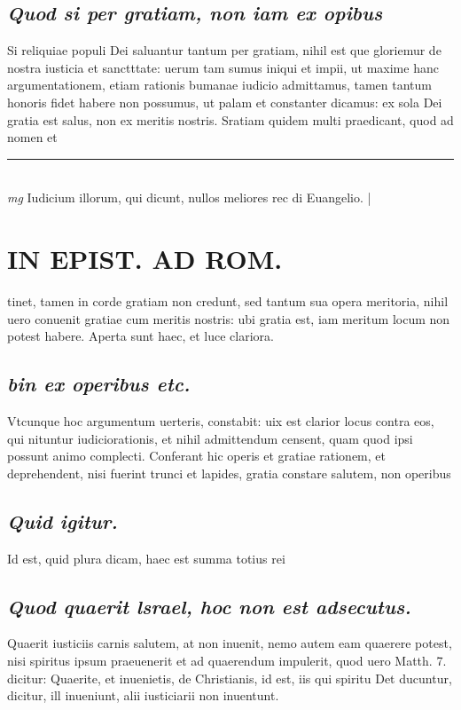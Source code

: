 \documentclass{article}
\begin{document}
\begin{pages}
\subsection*{\textit{Quod si per gratiam, non iam ex opibus }}\pstart Si reliquiae populi Dei saluantur tantum per gratiam, nihil est que gloriemur de nostra iusticia et sanctttate: uerum tam sumus iniqui et impii, ut maxime hanc argumentationem, etiam rationis bumanae iudicio admittamus, tamen tantum honoris fidet habere non possumus, ut palam et constanter dicamus: ex sola Dei gratia est salus, non ex meritis nostris. Sratiam quidem multi praedicant, quod ad nomen et  \pend
\vspace{0.5cm}\noindent
\vspace{0.2cm}\rule{1cm}{0.2pt}\\ 
\hspace{0.2cm}\textit{mg}
\footnotesize Iudicium illorum, qui dicunt, nullos meliores rec di Euangelio. 
\normalsize| 
\section*{IN EPIST. AD ROM.  }
\marginpar{[ p.125 ]}\pstart tinet, tamen in corde gratiam non credunt, sed tantum sua opera meritoria, nihil uero conuenit gratiae cum meritis nostris: ubi gratia est, iam meritum locum non potest habere. Aperta sunt haec, et luce clariora.   \pend
{}
{}
\subsection*{\textit{bin ex operibus etc. }}\pstart Vtcunque hoc argumentum uerteris, constabit: uix est clarior locus contra eos, qui nituntur iudiciorationis, et nihil admittendum censent, quam quod ipsi possunt animo complecti. Conferant hic operis et gratiae rationem, et deprehendent, nisi fuerint trunci et lapides, gratia constare salutem, non operibus\pend
{}
{}
\subsection*{\textit{Quid igitur. }}\pstart Id est, quid plura dicam, haec est summa totius rei\pend
{}
{}
\subsection*{\textit{Quod quaerit lsrael, hoc non est adsecutus. }}\pstart Quaerit iusticiis carnis salutem, at non inuenit, nemo autem eam quaerere potest, nisi spiritus ipsum praeuenerit et ad quaerendum impulerit, quod uero Matth. 7. dicitur: Quaerite, et inuenietis, de Christianis, id est, iis qui spiritu Det ducuntur, dicitur, ill inueniunt, alii iusticiarii non inuentunt.   \pend
{}
{}

\end{pages}
\end{document}

